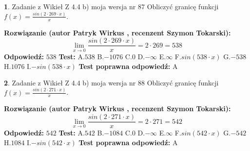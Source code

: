 \documentclass[12pt, a4paper]{article}
\theoremstyle{definition} %
\newtheorem{zad}{}
\newcommand{\zadStart}[1]{\begin{zad}#1\newline}
\newcommand{\zadStop}{\end{zad}}
\newcommand{\rozwStart}[2]{\noindent \textbf{Rozwiązanie (autor #1 , recenzent #2): }\newline}
\newcommand{\rozwStop}{\newline}
\newcommand{\odpStart}{\noindent \textbf{Odpowiedź:}\newline}
\newcommand{\odpStop}{\newline}
\newcommand{\testStart}{\noindent \textbf{Test:}\newline}
\newcommand{\testStop}{\newline}
\newcommand{\kluczStart}{\noindent \textbf{Test poprawna odpowiedź:}\newline}
\newcommand{\kluczStop}{\newline}
\begin{document}
\zadStart{Zadanie z Wikieł Z 4.4 b) moja wersja nr 87}
Obliczyć granicę funkcji $f(x)=\frac{sin(2 \cdot269\cdot x)}{x}$.
\zadStop
\rozwStart{Patryk Wirkus}{Szymon Tokarski}
$$\lim\limits_{x\to 0}\frac{sin(2 \cdot 269\cdot x)}{x}=
2 \cdot 269 = 538$$
\rozwStop
\odpStart
$538$
\odpStop
\testStart
A.$538$
B.$-1076$
C.$0$
D.$-\infty$
E.$\infty$
F.$sin(538\cdot x)$
G.$-538$
H.$1076$
I.$-sin(538\cdot x)$
\testStop
\kluczStart
A
\kluczStop



\zadStart{Zadanie z Wikieł Z 4.4 b) moja wersja nr 88}
Obliczyć granicę funkcji $f(x)=\frac{sin(2 \cdot271\cdot x)}{x}$.
\zadStop
\rozwStart{Patryk Wirkus}{Szymon Tokarski}
$$\lim\limits_{x\to 0}\frac{sin(2 \cdot 271\cdot x)}{x}=
2 \cdot 271 = 542$$
\rozwStop
\odpStart
$542$
\odpStop
\testStart
A.$542$
B.$-1084$
C.$0$
D.$-\infty$
E.$\infty$
F.$sin(542\cdot x)$
G.$-542$
H.$1084$
I.$-sin(542\cdot x)$
\testStop
\kluczStart
A
\kluczStop
\end{document}
